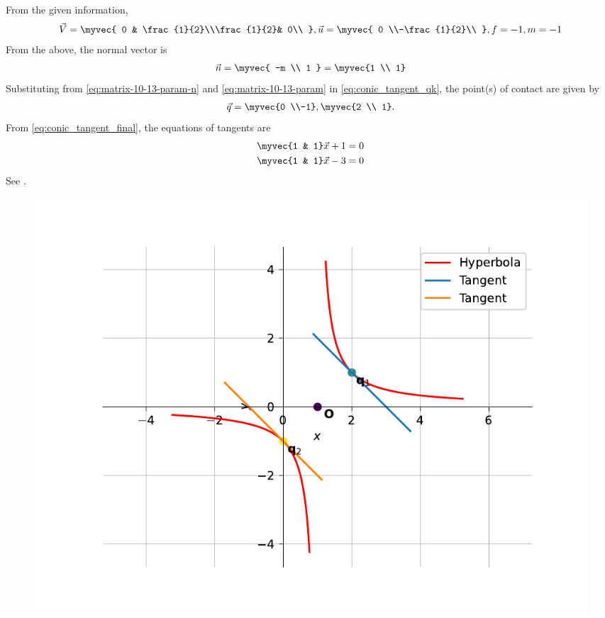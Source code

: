 From the given information, 
\begin{align}
	\vec{V}
	=\myvec{
		0 & \frac{1}{2}\\\frac{1}{2}& 0\\
	},
\vec{u} = \myvec{
0 \\-\frac{1}{2}\\
},  f = -1, m=-1
	\label{eq:matrix-10-13-param}
\end{align}
From the above, the  normal vector is
\begin{align}
\vec{n}=\myvec{
-m \\ 1
	} = \myvec{1 \\ 1}
	\label{eq:matrix-10-13-param-n}
\end{align}
Substituting from 
	\eqref{eq:matrix-10-13-param-n}
	and
	\eqref{eq:matrix-10-13-param}
	in 
\eqref{eq:conic_tangent_qk},
	the point(s) of contact are given by
\begin{align}
\vec{q}=\myvec{0 \\-1}, \myvec{2 \\ 1}.
\end{align}
From 
  \eqref{eq:conic_tangent_final},
the equations of tangents are 
\begin{align}
	\myvec{1 & 1}\vec{x}+1&=0\\
\myvec{1 & 1}\vec{x}-3&=0\\
\end{align}
See 
		.
	\begin{figure}[H]
		\centering
 \includegraphics[width=0.75\columnwidth]{chapters/12/6/3/10/figs/fig.pdf}
		\caption{}
		\label{fig:12/6/3/10}
  	\end{figure}
